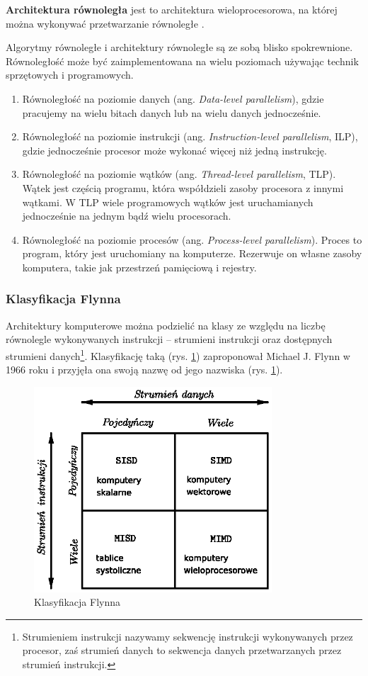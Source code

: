 \begin{definicja}\label{def:arch_rownolegla}
\textbf{Architektura równoległa} jest to architektura wieloprocesorowa, na której można wykonywać przetwarzanie równoległe \cite{IEEE}.
\end{definicja}

Algorytmy równoległe i architektury równoległe są ze sobą blisko spokrewnione. Równoległość może być zaimplementowana na wielu poziomach używając technik sprzętowych i programowych.
\begin{enumerate}
\item{Równoległość na poziomie danych (ang. \emph{Data-level parallelism}), gdzie pracujemy na wielu bitach danych lub na wielu danych jednocześnie.}
\item{Równoległość na poziomie instrukcji (ang. \emph{Instruction-level parallelism}, ILP), gdzie jednocześnie procesor może wykonać więcej niż jedną instrukcję.}
\item{Równoległość na poziomie wątków (ang. \emph{Thread-level parallelism}, TLP). Wątek jest częścią programu, która współdzieli zasoby procesora z innymi wątkami. W TLP wiele programowych wątków jest uruchamianych jednocześnie na jednym bądź wielu procesorach.}
\item{Równoległość na poziomie procesów (ang. \emph{Process-level parallelism}). Proces to program, który jest uruchomiany na komputerze. Rezerwuje on własne zasoby komputera, takie jak przestrzeń pamięciową i rejestry.\cite{APC2011}}
\end{enumerate}

\subsubsection{Klasyfikacja Flynna}
Architektury komputerowe można podzielić na klasy ze względu na liczbę równolegle wykonywanych instrukcji -- strumieni instrukcji oraz dostępnych strumieni danych\footnote{Strumieniem instrukcji nazywamy sekwencję instrukcji wykonywanych przez procesor, zaś strumień danych to sekwencja danych przetwarzanych przez strumień instrukcji.}. 
Klasyfikację taką (rys. \ref{fig:flynn}) zaproponował Michael J. Flynn w 1966 roku i przyjęła ona swoją nazwę od jego nazwiska (rys. \ref{fig:flynn}).

\begin{figure}
\centering
\includegraphics[width=24em]{images/flynn.eps}
\caption{Klasyfikacja Flynna}
\label{fig:flynn}
\end{figure}

